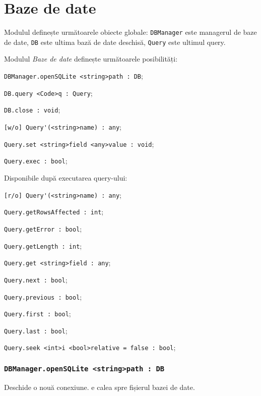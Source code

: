 \section{Baze de date}

Modulul definește următoarele obiecte globale: \lstinline|DBManager| este managerul de baze de date, \lstinline|DB| este ultima bază de date deschisă, \lstinline|Query| este ultimul query.

Modulul \textit{Baze de date} definește următoarele posibilități:
\begin{icItems}
	\item \lstinline|DBManager.openSQLite <string>path : DB|;
	\item \lstinline|DB.query <Code>q : Query|;
	\item \lstinline|DB.close : void|;
	\item \lstinline|[w/o] Query'(<string>name) : any|;
	\item \lstinline|Query.set <string>field <any>value : void|;
	\item \lstinline|Query.exec : bool|;
	\item Disponibile după executarea query-ului:
	\begin{icItems}
		\item \lstinline|[r/o] Query'(<string>name) : any|;
		\item \lstinline|Query.getRowsAffected : int|;
		\item \lstinline|Query.getError : bool|;
		\item \lstinline|Query.getLength : int|;
		\item \lstinline|Query.get <string>field : any|;
		\item \lstinline|Query.next : bool|;
		\item \lstinline|Query.previous : bool|;
		\item \lstinline|Query.first : bool|;
		\item \lstinline|Query.last : bool|;
		\item \lstinline|Query.seek <int>i <bool>relative = false : bool|;
	\end{icItems}
\end{icItems}

\subsubsection{\lstinline|DBManager.openSQLite <string>path : DB|}

Deschide o nouă conexiune.  e calea spre fișierul bazei de date.

